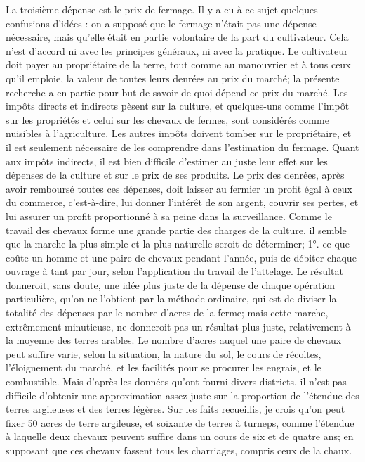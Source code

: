La troisième dépense est le prix de fermage. Il y a eu à ce sujet quelques confusions d'idées : on a supposé que le fermage n'était pas une dépense nécessaire, mais qu'elle était en partie volontaire de la part du cultivateur. Cela n'est d'accord ni avec les principes généraux, ni avec la pratique. Le cultivateur doit payer au propriétaire de la terre, tout comme au manouvrier et à tous ceux qu'il emploie, la valeur de toutes leurs denrées au prix du marché; la présente recherche a en partie pour but de savoir de quoi dépend ce prix du marché.
Les impôts directs et indirects pèsent sur la culture, et quelques-uns comme l'impôt sur les propriétés et celui sur les chevaux de fermes, sont considérés comme nuisibles à l'agriculture. Les autres impôts doivent tomber sur le propriétaire, et il est seulement nécessaire de les comprendre dans l'estimation du fermage. Quant aux impôts indirects, il est bien difficile d'estimer au juste leur effet sur les dépenses de la culture et sur le prix de ses produits.
Le prix des denrées, après avoir remboursé toutes ces dépenses, doit laisser au\setcounter{page}{309} fermier un profit égal à ceux du commerce, c'est-à-dire, lui donner l'intérêt de son argent, couvrir ses pertes, et lui assurer un profit proportionné à sa peine dans la surveillance.
Comme le travail des chevaux forme une grande partie des charges de la culture, il semble que la marche la plus simple et la plus naturelle seroit de déterminer; 1°. ce que coûte un homme et une paire de chevaux pendant l'année, puis de débiter chaque ouvrage à tant par jour, selon l'application du travail de l'attelage. Le résultat donneroit, sans doute, une idée plus juste de la dépense de chaque opération particulière, qu'on ne l'obtient par la méthode ordinaire, qui est de diviser la totalité des dépenses par le nombre d'acres de la ferme; mais cette marche, extrêmement minutieuse, ne donneroit pas un résultat plus juste, relativement à la moyenne des terres arables. Le nombre d'acres auquel une paire de chevaux peut suffire varie, selon la situation, la nature du sol, le cours de récoltes, l'éloignement du marché, et les facilités pour se procurer les engrais, et le combustible. Mais d'après les données qu'ont fourni divers districts, il n'est pas difficile d'obtenir\setcounter{page}{310} une approximation assez juste sur la proportion de l'étendue des terres argileuses et des terres légères. Sur les faits recueillis, je crois qu'on peut fixer 50 acres de terre argileuse, et soixante de terres à turneps, comme l'étendue à laquelle deux chevaux peuvent suffire dans un cours de six et de quatre ans; en supposant que ces chevaux fassent tous les charriages, compris ceux de la chaux.

